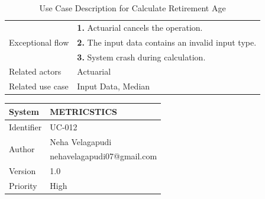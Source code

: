 \begin{table}[htb]
\begin{tabular}{|p{4cm}|p{12cm}|}
         
        
        \hline
        \multirow{3}{*}{Exceptional flow} 
        & \textbf{1.} Actuarial cancels the operation. \\ 
        & \textbf{2.} The input data contains an invalid input type. \\
         & \textbf{3.} System crash during calculation. \\  \hline 
        Related actors & Actuarial \\ \hline
        Related use case & Input Data, Median  \\ \hline
    \end{tabular}
    \caption{Use Case Description for Calculate Retirement Age}
    \label{tab:my_label}
\end{table}
\begin{table}[htb]
    \centering
     \begin{tabular}{|p{4cm}|p{12cm}|} \hline 
         System &  METRICSTICS\\ \hline 
         
         Identifier & UC-012 \\ \hline 
         
         \multirow{2}{*}{Author} & Neha Velagapudi   \\
         &nehavelagapudi07@gmail.com \\
           \hline 
           Version & 1.0\\ \hline
         
         Priority &  High\\ \hline 
         

\end{tabular}
\end{table}
